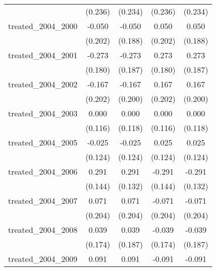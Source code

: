 {\begin{tabular}{l*{4}{c}}
            &     (0.236)         &     (0.234)         &     (0.236)         &     (0.234)         \\
[1em]
treated\_2004\_2000&      -0.050         &      -0.050         &       0.050         &       0.050         \\
            &     (0.202)         &     (0.188)         &     (0.202)         &     (0.188)         \\
[1em]
treated\_2004\_2001&      -0.273         &      -0.273         &       0.273         &       0.273         \\
            &     (0.180)         &     (0.187)         &     (0.180)         &     (0.187)         \\
[1em]
treated\_2004\_2002&      -0.167         &      -0.167         &       0.167         &       0.167         \\
            &     (0.202)         &     (0.200)         &     (0.202)         &     (0.200)         \\
[1em]
treated\_2004\_2003&       0.000         &       0.000         &       0.000         &       0.000         \\
            &     (0.116)         &     (0.118)         &     (0.116)         &     (0.118)         \\
[1em]
treated\_2004\_2005&      -0.025         &      -0.025         &       0.025         &       0.025         \\
            &     (0.124)         &     (0.124)         &     (0.124)         &     (0.124)         \\
[1em]
treated\_2004\_2006&       0.291\sym{*}  &       0.291\sym{*}  &      -0.291\sym{*}  &      -0.291\sym{*}  \\
            &     (0.144)         &     (0.132)         &     (0.144)         &     (0.132)         \\
[1em]
treated\_2004\_2007&       0.071         &       0.071         &      -0.071         &      -0.071         \\
            &     (0.204)         &     (0.204)         &     (0.204)         &     (0.204)         \\
[1em]
treated\_2004\_2008&       0.039         &       0.039         &      -0.039         &      -0.039         \\
            &     (0.174)         &     (0.187)         &     (0.174)         &     (0.187)         \\
[1em]
treated\_2004\_2009&       0.091         &       0.091         &      -0.091         &      -0.091         \\

\end{tabular}}

